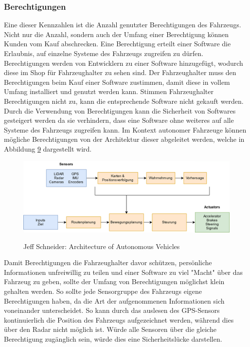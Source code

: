 \subsubsection{Berechtigungen}
Eine dieser Kennzahlen ist die Anzahl genutzter Berechtigungen des Fahrzeugs. Nicht nur die Anzahl, sondern auch der Umfang einer Berechtigung können Kunden vom Kauf abschrecken.\cite[S. 107]{android} Eine Berechtigung erteilt einer Software die Erlaubnis, auf einzelne Systeme des Fahrzeugs zugreifen zu dürfen. Berechtigungen werden von Entwicklern zu einer Software hinzugefügt, wodurch diese im Shop für Fahrzeughalter zu sehen sind. Der Fahrzeughalter muss den Berechtigungen beim Kauf einer Software zustimmen, damit diese in vollem Umfang installiert und genutzt werden kann. Stimmen Fahrzeughalter Berechtigungen nicht zu, kann die entsprechende Software nicht gekauft werden. Durch die Verwendung von Berechtigungen kann die Sicherheit von Softwares gesteigert werden da sie verhindern, dass eine Software ohne weiteres auf alle Systeme des Fahrzeugs zugreifen kann. Im Kontext autonomer Fahrzeuge können mögliche Berechtigungen von der Architektur dieser abgeleitet werden, welche in Abbildung \hyperref[img:av_architecture]{9} dargestellt wird. 
\begin{figure}[H]
	\centering
	\includegraphics[width=0.95\columnwidth]{pictures/arichtecture_AV.png}
	\label{img:av_architecture}
	\caption{Jeff Schneider: Architecture of Autonomous Vehicles}
\end{figure}

Damit Berechtigungen die Fahrzeughalter davor schützen, persönliche Informationen unfreiwillig zu teilen und einer Software zu viel "Macht" über das Fahrzeug zu geben, sollte der Umfang von Berechtigungen möglichst klein gehalten werden. So sollte jede Sensorgruppe des Fahrzeugs eigene Berechtigungen haben, da die Art der aufgenommenen Informationen sich voneinander unterscheidet. So kann durch das auslesen des GPS-Sensors kontinuierlich die Position des Fahrzeugs aufgezeichnet werden, während dies über den Radar nicht möglich ist. Würde alle Sensoren über die gleiche Berechtigung zugänglich sein, würde dies eine Sicherheitslücke darstellen.\\

